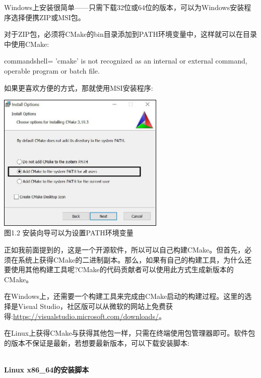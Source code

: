 
Windows上安装很简单——只需下载32位或64位的版本，可以为Windows安装程序选择便携ZIP或MSI包。

对于ZIP包，必须将CMake的bin目录添加到PATH环境变量中，这样就可以在目录中使用CMake:

\begin{tcblisting}{commandshell={}}
'cmake' is not recognized as an internal or external command,
operable program or batch file.
\end{tcblisting}

如果更喜欢方便的方式，那就使用MSI安装程序:

\begin{center}
\includegraphics[width=0.6\textwidth]{content/1/chapter1/images/2.jpg}\\
图1.2 安装向导可以为设置PATH环境变量
\end{center}

正如我前面提到的，这是一个开源软件，所以可以自己构建CMake。但首先，必须在系统上获得CMake的二进制副本。那么，如果有自己的构建工具，为什么还要使用其他构建工具呢?CMake的代码贡献者可以使用此方式生成新版本的CMake。

在Windows上，还需要一个构建工具来完成由CMake启动的构建过程。这里的选择是Visual Studio，社区版可以从微软的网站上免费获得:\url{https://visualstudio.microsoft.com/downloads/}。


在Linux上获得CMake与获得其他包一样，只需在终端使用包管理器即可。软件包的版本不保证是最新，若想要最新版本，可以下载安装脚本:

\hspace*{\fill} \\ %
\noindent
\textbf{Linux x86\_64的安装脚本}

